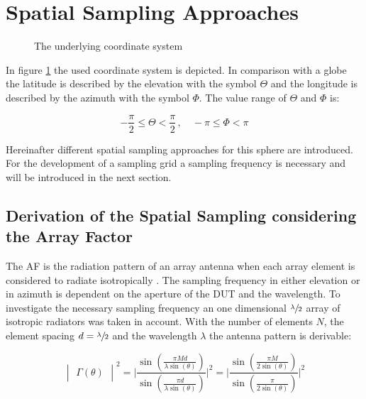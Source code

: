 \section{Spatial Sampling Approaches}

\begin{figure}
\centering
\def\svgwidth{0.4\textwidth}

\caption{The underlying coordinate system}
\label{coordinates}
\end{figure}

In figure \ref{coordinates} the used coordinate system is depicted. In comparison with a globe the latitude is described by the elevation with the symbol $\Theta$ and the longitude is described by the azimuth with the symbol $\Phi$. The value range of $\Theta$ and $\Phi$ is:

\begin{equation}
-\frac{\pi}{2} \leq \Theta <\frac{\pi}{2}\, ,\quad -\pi \leq \Phi < \pi
\end{equation}

Hereinafter different spatial sampling approaches for this sphere are introduced. For the development of a sampling grid a sampling frequency is necessary and will be introduced in the next section.

\subsection{Derivation of the Spatial Sampling considering the Array Factor}
\label{sec:spasa}

The \ac{AF} is \glqq the radiation pattern of an array antenna when each array element is considered to radiate isotropically\grqq{} \cite{ieeeantenna}. The sampling frequency in either elevation or in azimuth is dependent on the aperture of the \ac{DUT} and the wavelength. To investigate the necessary sampling frequency an one dimensional $\sfrac{\lambda}{2}$ array of isotropic radiators was taken in account. With the number of elements $N$, the element spacing $d = \sfrac{\lambda}{2}$ and the wavelength $\lambda$ the antenna pattern is derivable: \cite{litze}

\begin{equation}
\begin{vmatrix}\Gamma\left(\theta\right)\end{vmatrix}^2 = \Biggl|\frac{\sin\left(\frac{\pi M d}{\lambda \sin\left(\theta\right)}\right)}{\sin\left(\frac{\pi d}{\lambda \sin\left(\theta\right)}\right)}\Biggl|^2 = \Biggl|\frac{\sin\left(\frac{\pi M}{2 \sin\left(\theta\right)}\right)}{\sin\left(\frac{\pi}{2 \sin\left(\theta\right)}\right)}\Biggl|^2
\end{equation}

